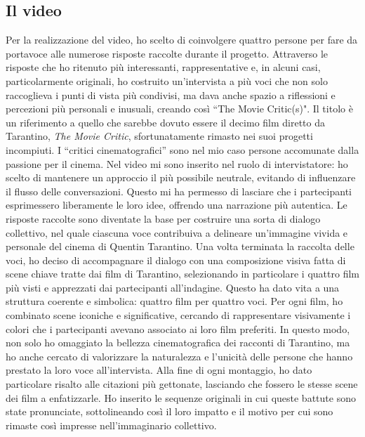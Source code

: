 \documentclass[12pt]{article} %
\begin{document}
\subsection{Il video}
    \begin{flushleft}
        Per la realizzazione del video, ho scelto di coinvolgere quattro persone per fare da portavoce alle numerose risposte raccolte durante il progetto. 
        Attraverso le risposte che ho ritenuto più interessanti, rappresentative e, in alcuni casi, particolarmente originali, ho costruito un’intervista a più voci che non solo raccoglieva i punti di vista più condivisi, ma dava anche spazio a riflessioni e percezioni più personali e inusuali, creando così ``The Movie Critic(s)". 
        Il titolo è un riferimento a quello che sarebbe dovuto essere il decimo film diretto da Tarantino, \textit{The Movie Critic}, sfortunatamente rimasto nei suoi progetti incompiuti. I ``critici cinematografici'' sono nel mio caso persone accomunate dalla passione per il cinema.
        Nel video mi sono inserito nel ruolo di intervistatore: ho scelto di mantenere un approccio il più possibile neutrale, evitando di influenzare il flusso delle conversazioni. Questo mi ha permesso di lasciare che i partecipanti esprimessero liberamente le loro idee, offrendo una narrazione più autentica. Le risposte raccolte sono diventate la base per costruire una sorta di dialogo collettivo, nel quale ciascuna voce contribuiva a delineare un’immagine vivida e personale del cinema di Quentin Tarantino. 
        Una volta terminata la raccolta delle voci, ho deciso di accompagnare il dialogo con una composizione visiva fatta di scene chiave tratte dai film di Tarantino, selezionando in particolare i quattro film più visti e apprezzati dai partecipanti all'indagine.
        Questo ha dato vita a una struttura coerente e simbolica: quattro film per quattro voci. Per ogni film, ho combinato scene iconiche e significative, cercando di rappresentare visivamente i colori che i partecipanti avevano associato ai loro film preferiti. 
        In questo modo, non solo ho omaggiato la bellezza cinematografica dei racconti di Tarantino, ma ho anche cercato di valorizzare la naturalezza e l’unicità delle persone che hanno prestato la loro voce all’intervista.
        Alla fine di ogni montaggio, ho dato particolare risalto alle citazioni più gettonate, lasciando che fossero le stesse scene dei film a enfatizzarle. Ho inserito le sequenze originali in cui queste battute sono state pronunciate, sottolineando così il loro impatto e il motivo per cui sono rimaste così impresse nell’immaginario collettivo.
    \end{flushleft}
    \break
\end{document}
